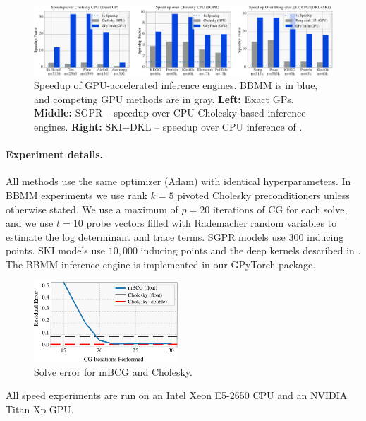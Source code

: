 \begin{figure}[t]
  \includegraphics[width=\textwidth]{figures/sparse_gp_results}
  \caption{
    Speedup of GPU-accelerated inference engines.
    BBMM is in blue, and competing GPU methods are in gray.
    {\bf Left:} Exact GPs. {\bf Middle:} SGPR \cite{titsias2009variational,hensman2013gaussian} -- speedup over CPU Cholesky-based inference engines.
    {\bf Right:} SKI+DKL \cite{wilson2015kernel,wilson2016deep} -- speedup over CPU inference of \citet{dong2017scalable}.
  }
  \label{fig:timing_results}
\end{figure}

\paragraph{Experiment details.} All methods use the same optimizer (Adam) with identical hyperparameters.
In BBMM experiments we use rank $k\!=\!5$ pivoted Cholesky preconditioners unless otherwise stated.
We use a maximum of $p\!=\!20$ iterations of CG for each solve, and
we use $t\!=\!10$ probe vectors filled with Rademacher random variables to estimate the log determinant and trace terms.
SGPR models use $300$ inducing points.
SKI models use $10,\!000$ inducing points and  the deep kernels described in \cite{wilson2016deep}.
The BBMM inference engine is implemented in our GPyTorch package.
\begin{figure}[t!]
  \begin{center}
    \includegraphics[width=0.48\textwidth]{figures/cg_error}
  \end{center}
  \caption{Solve error for mBCG and Cholesky. \label{fig:cg_error}}
\end{figure}
All speed experiments are run on an Intel Xeon E5-2650 CPU and an NVIDIA Titan Xp GPU.


